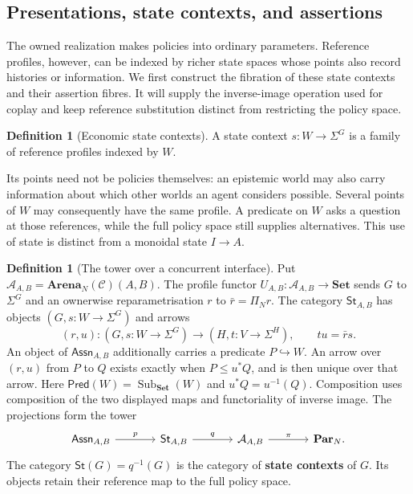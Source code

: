 \documentclass[11pt,a4paper]{article}
\numberwithin{equation}{section}
\theoremstyle{definition}
\newtheorem{definition}[theorem]{Definition}
\theoremstyle{remark}
\theoremstyle{plain}
\begin{document}
\subsection{Presentations, state contexts, and assertions}

The owned realization makes policies into ordinary parameters.
Reference profiles, however, can be indexed by richer state spaces whose
points also record histories or information. We first construct the
fibration of these state contexts and their assertion fibres. It will
supply the inverse-image operation used for coplay and keep reference
substitution distinct from restricting the policy space.

\begin{definition}[Economic state contexts]
\label{def:egt-economic-state-context}
A state context $s:W\to\Sigma^G$ is a family of reference profiles indexed
by $W$.
\end{definition}

Its points need not be policies themselves: an epistemic world may
also carry information about which other worlds an agent considers
possible. Several points of $W$ may consequently have the same profile.
A predicate on $W$ asks a question at those references, while the full policy
space still supplies alternatives. This use of state is distinct from
a monoidal state $I\to A$.

\begin{definition}[The tower over a concurrent interface]
\label{def:fib-tower}
Put $\mathcal A_{A,B}=\mathbf{Arena}_N(\mathcal C)(A,B)$.
The profile functor $U_{A,B}:\mathcal A_{A,B}\to\mathbf{Set}$ sends
$G$ to $\Sigma^G$ and an ownerwise reparametrisation $r$ to
$\bar r=\Pi_Nr$. The category $\mathsf{St}_{A,B}$ has objects
$(G,s:W\to\Sigma^G)$ and arrows
\[
 (r,u):(G,s:W\to\Sigma^G)\longrightarrow(H,t:V\to\Sigma^H),
 \qquad tu=\bar r s.
\]
An object of $\mathsf{Assn}_{A,B}$ additionally carries a predicate
$P\hookrightarrow W$. An arrow over $(r,u)$ from $P$ to $Q$ exists
exactly when $P\leq u^*Q$, and is then unique over that arrow.
Here $\mathsf{Pred}(W)=\operatorname{Sub}_{\mathbf{Set}}(W)$ and
$u^*Q=u^{-1}(Q)$. Composition uses composition of the two displayed
maps and functoriality of inverse image. The projections form the tower
\[
\begin{tikzcd}[column sep=large]
 \mathsf{Assn}_{A,B}\arrow[r,"p"]&
 \mathsf{St}_{A,B}\arrow[r,"q"]&
 \mathcal A_{A,B}\arrow[r,"\pi"]&\mathbf{Par}_N.
\end{tikzcd}
\]
The category $\mathsf{St}(G)=q^{-1}(G)$ is the category of
\textbf{state contexts} of $G$. Its objects retain their reference map
to the full policy space.
\end{definition}
\end{document}
